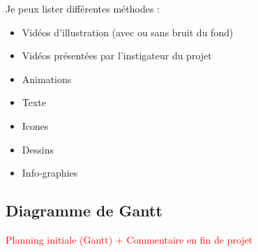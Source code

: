 Je peux lister différentes méthodes :
\begin{itemize}
    \item Vidéos d'illustration (avec ou sans bruit du fond)
    \item Vidéos présentées par l'instigateur du projet
    \item Animations
    \item Texte
    \item Icones
    \item Dessins
    \item Info-graphies
\end{itemize}

\subsection{Diagramme de Gantt}\label{subsec:diagramme-de-gantt}


\textcolor{red}{Planning initiale  (Gantt) + Commentaire en fin de projet}




